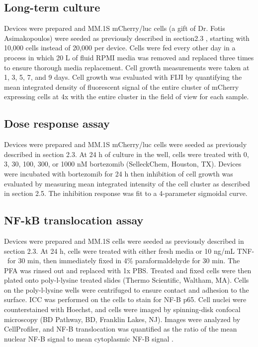 \subsection{Long-term culture}
Devices were prepared and MM.1S mCherry/luc cells (a gift of Dr. Fotis Asimakopoulos) were seeded as previously described in section2.3 , starting with 10,000 cells instead of 20,000 per device. Cells were fed every other day in a process in which 20 \textmu L of fluid RPMI media was removed and replaced three times to ensure thorough media replacement. Cell growth measurements were taken at 1, 3, 5, 7, and 9 days. Cell growth was evaluated with FIJI by quantifying the mean integrated density of fluorescent signal of the entire cluster of mCherry expressing cells at 4x with the entire cluster in the field of view for each sample. 
 

\subsection{Dose response assay}
 Devices were prepared and MM.1S mCherry/luc cells were seeded as previously described in section 2.3. At 24 h of culture in the well, cells were treated with 0, 3, 30, 100, 300, or 1000 nM bortezomib (SelleckChem, Houston, TX). Devices were incubated with bortezomib for 24 h then inhibition of cell growth was evaluated by measuring mean integrated intensity of the cell cluster as described in section 2.5. The inhibition response was fit to a 4-parameter sigmoidal curve.


\subsection{NF-kB translocation assay}
Devices were prepared and MM.1S cells were seeded as previously described in section 2.3. At 24 h, cells were treated with either fresh media or 10 ng/mL TNF-\textalpha \ for 30 min, then immediately fixed in 4\% paraformaldehyde for 30 min. The PFA was rinsed out and replaced with 1x PBS. Treated and fixed cells were then plated onto poly-l-lysine treated slides (Thermo Scientific, Waltham, MA). Cells on the poly-l-lysine wells were centrifuged to ensure contact and adhesion to the surface. ICC was performed on the cells to stain for NF-\textkappa B p65. Cell nuclei were counterstained with Hoechst, and cells were imaged by spinning-disk confocal microscopy (BD Pathway, BD, Franklin Lakes, NJ). Images were analyzed by CellProfiler, and NF-\textkappa B translocation was quantified as the ratio of the mean nuclear NF-\textkappa B signal to mean cytoplasmic NF-\textkappa B signal \cite{Kasper2010}. 


